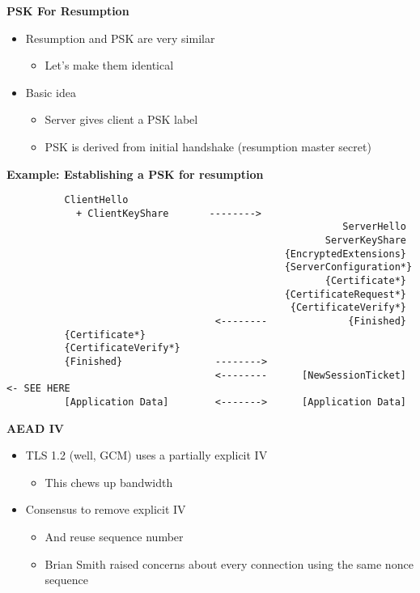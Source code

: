 \documentclass[helvetica]{seminar}
\newcommand{\heading}[1]{%
  \begin{center} 
    \large\bf 
    #1 
  \end{center} 
  \vspace{.4 in}}
\begin{document}
\begin{slide}
\heading{PSK For Resumption}

\begin{itemize}
\item Resumption and PSK are very similar
  \begin{itemize}
  \item Let's make them identical
  \end{itemize}

\item Basic idea
  \begin{itemize}
  \item Server gives client a PSK label
  \item PSK is derived from initial handshake (resumption master secret)
  \end{itemize}
\end{itemize}
\end{slide}


\begin{slide}
\heading{Example: Establishing a PSK for resumption}

\begin{footnotesize}
\begin{verbatim}
          ClientHello
            + ClientKeyShare       -------->
                                                          ServerHello
                                                       ServerKeyShare
                                                {EncryptedExtensions}
                                                {ServerConfiguration*}
                                                       {Certificate*}
                                                {CertificateRequest*}
                                                 {CertificateVerify*}
                                    <--------              {Finished}
          {Certificate*}
          {CertificateVerify*}
          {Finished}                -------->
                                    <--------      [NewSessionTicket] <- SEE HERE
          [Application Data]        <------->      [Application Data]
\end{verbatim}
\end{footnotesize}
\end{slide}


\begin{slide}
\heading{AEAD IV}

\begin{itemize}
\item TLS 1.2 (well, GCM) uses a partially explicit IV
  \begin{itemize}
  \item This chews up bandwidth
  \end{itemize}
  
\item Consensus to remove explicit IV
  \begin{itemize}
  \item And reuse sequence number
  \item Brian Smith raised concerns about every connection using the same nonce sequence
  \end{itemize}
\end{itemize}
\end{slide}
\end{document}
